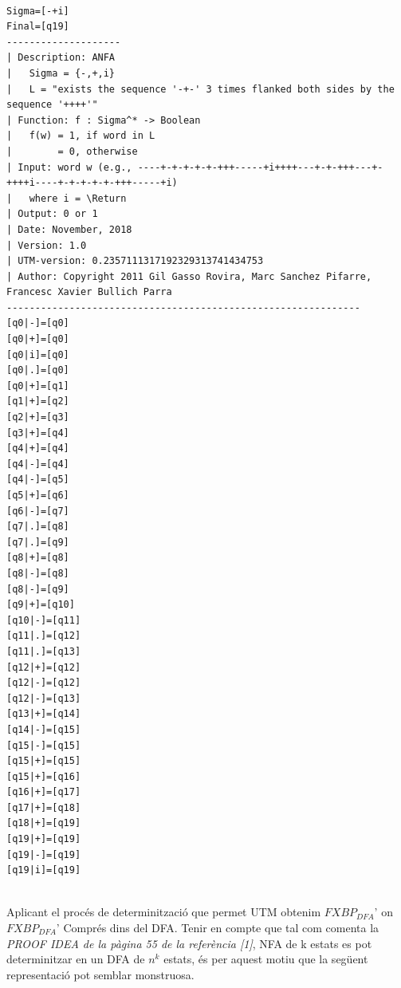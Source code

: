 \documentclass[12pt,a4paper]{report}
\def \dfa{$FXBP_{DFA} $}
\begin{document}
\begin{lstlisting}

Sigma=[-+i]
Final=[q19]
--------------------
| Description: ANFA
|   Sigma = {-,+,i}
|   L = "exists the sequence '-+-' 3 times flanked both sides by the sequence '++++'"
| Function: f : Sigma^* -> Boolean
|   f(w) = 1, if word in L
|        = 0, otherwise
| Input: word w (e.g., ----+-+-+-+-+-+++-----+i++++---+-+-+++---+-++++i----+-+-+-+-+-+++-----+i)
|   where i = \Return
| Output: 0 or 1
| Date: November, 2018
| Version: 1.0
| UTM-version: 0.2357111317192329313741434753
| Author: Copyright 2011 Gil Gasso Rovira, Marc Sanchez Pifarre, Francesc Xavier Bullich Parra
--------------------------------------------------------------
[q0|-]=[q0]
[q0|+]=[q0]
[q0|i]=[q0]
[q0|.]=[q0]
[q0|+]=[q1]
[q1|+]=[q2]
[q2|+]=[q3]
[q3|+]=[q4]
[q4|+]=[q4]
[q4|-]=[q4]
[q4|-]=[q5]
[q5|+]=[q6]
[q6|-]=[q7]
[q7|.]=[q8]
[q7|.]=[q9]
[q8|+]=[q8]
[q8|-]=[q8]
[q8|-]=[q9]
[q9|+]=[q10]
[q10|-]=[q11]
[q11|.]=[q12]
[q11|.]=[q13]
[q12|+]=[q12]
[q12|-]=[q12]
[q12|-]=[q13]
[q13|+]=[q14]
[q14|-]=[q15]
[q15|-]=[q15]
[q15|+]=[q15]
[q15|+]=[q16]
[q16|+]=[q17]
[q17|+]=[q18]
[q18|+]=[q19]
[q19|+]=[q19]
[q19|-]=[q19]
[q19|i]=[q19]


\end{lstlisting}

Aplicant el procés de determinització que permet UTM obtenim \dfa{}' on \dfa{}' Comprés dins del DFA. Tenir en compte que tal com comenta la \textit{PROOF IDEA de la pàgina 55 de la referència [1]}, NFA de k estats es pot determinitzar en un DFA de $n^k$ estats, és per aquest motiu que la següent representació pot semblar monstruosa.
\end{document}
